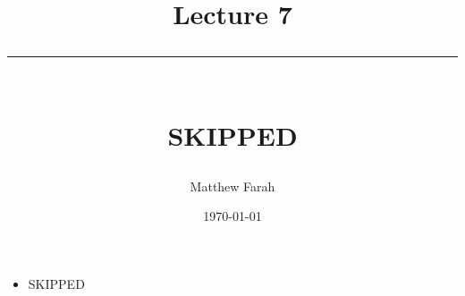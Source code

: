\documentclass{article}
\date{
	\vspace{-.75em}
	{\large \today}
}
\title{
	\vspace*{-1.5em}
	{\Huge Lecture 7} \\
	\vspace{-1em}
	\rule{\textwidth/4}{.01em} \\
	\vspace{-.25em}
	{\Large SKIPPED}
	\vspace{-.75em}
}
\author{
	{\large Matthew Farah}
}
\begin{document}
\maketitle
\pagestyle{fancy}

\fi

\begin{itemize}
	\item SKIPPED
\end{itemize}

\ifdefined\iscombined
	\newpage
\else
	
\end{document}
